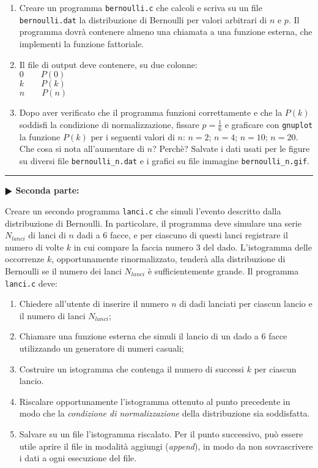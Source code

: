 \documentclass[11pt]{article}
\begin{document}
\begin{enumerate}
\item Creare un programma \texttt{bernoulli.c} che calcoli e scriva su un file \texttt{bernoulli.dat} la
distribuzione di Bernoulli per valori arbitrari di $n$ e $p$. Il programma dovr\`a contenere almeno
una chiamata a una funzione esterna, che implementi la funzione fattoriale.
\item Il file di output deve contenere, su due colonne:
\\
\texttt{$0 \quad \quad P(0)$}
\\
\texttt{$k \quad \quad P(k)$}
\\
\texttt{$n \quad \quad P(n)$}

\item Dopo aver verificato che il programma funzioni correttamente e che la $P(k)$ soddisfi la condizione di
normalizzazione, fissare $p=\frac{1}{6}$ e graficare con \texttt{gnuplot} la funzione $P(k)$ per i seguenti valori di $n$:
$n=2$; $n=4$; $n=10$; $n=20$.
Che cosa si nota all'aumentare di $n$? Perch\`e?
Salvate i dati usati per le figure su diversi file \texttt{bernoulli\_n.dat} e i grafici su file immagine
\texttt{bernoulli\_n.gif}.
\end{enumerate}

\hrule
\vspace{2mm}
\textbf{$\RHD$ Seconda parte:}
\vspace{2mm}

Creare un secondo programma \texttt{lanci.c} che simuli l'evento descritto dalla distribuzione di Bernoulli.
In particolare, il programma deve simulare una serie $N_{lanci}$ di lanci di $n$ dadi a 6 facce, e per
ciascuno di questi lanci registrare il numero di volte $k$ in cui compare la faccia numero 3 del dado.
L'istogramma delle occorrenze $k$, opportunamente rinormalizzato, tender\`a alla distribuzione di 
Bernoulli se il numero dei lanci $N_{lanci}$ \`e sufficientemente grande.
Il programma \texttt{lanci.c} deve:

\begin{enumerate}
\item Chiedere all'utente di inserire il numero $n$ di dadi lanciati per ciascun lancio e il numero di lanci $N_{lanci}$;
\item Chiamare una funzione esterna che simuli il lancio di un dado a 6 facce utilizzando un generatore di numeri casuali;
\item Costruire un istogramma che contenga il numero di successi $k$ per ciascun lancio.
\item Riscalare opportunamente l'istogramma ottenuto al punto precedente in modo che la {\em condizione di normalizzazione} della distribuzione sia soddisfatta.
\item Salvare su un file l'istogramma riscalato. Per il punto successivo, pu\`o essere utile aprire il file in modalit\`a aggiungi ({\em append}), in modo da non sovrascrivere i dati a ogni esecuzione del file.
\end{enumerate}
\end{document}
